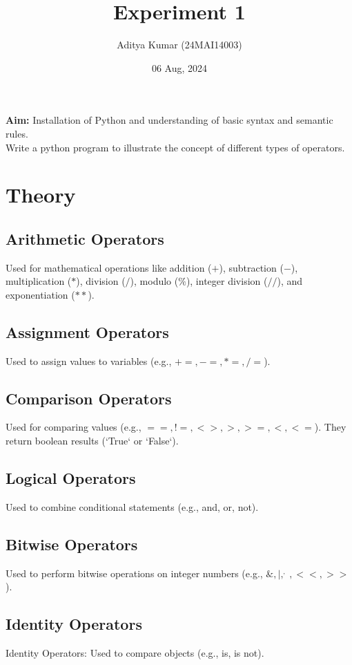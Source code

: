\documentclass[12pt]{fphw}
\title{Experiment 1}
\author{Aditya Kumar (24MAI14003)\\}
\date{06 Aug, 2024}
\institute{Chandigarh University\\Master of Engineeing---Artificial Intelligence}
\begin{document}
\maketitle

\section*{}
\begin{problem}
  \textbf{Aim: }Installation of Python and understanding of basic syntax and semantic rules.\\
  Write a python program to illustrate the concept of different types of operators.
\end{problem}
\section{Theory}
\subsection{Arithmetic Operators}
Used for mathematical operations like addition ($+$), subtraction ($-$), 
multiplication ($*$), division ($/$), modulo ($\%$), integer division ($//$), and exponentiation ($**$).
\subsection{Assignment Operators} 
Used to assign values to variables (e.g., $+=, -=, *=, /=$).
\subsection{Comparison Operators}
Used for comparing values (e.g., $==, !=, <>, >, >=, <, <=$). They return 
boolean results (`True` or `False`). 
\subsection{Logical Operators}
Used to combine conditional statements (e.g., and, or, not). 
\subsection{Bitwise Operators}
Used to perform bitwise operations on integer numbers (e.g., $\&, |, ^, ~, <<, >>$). 
\subsection{Identity Operators}
Identity Operators: Used to compare objects (e.g., is, is not). 
\end{document}
